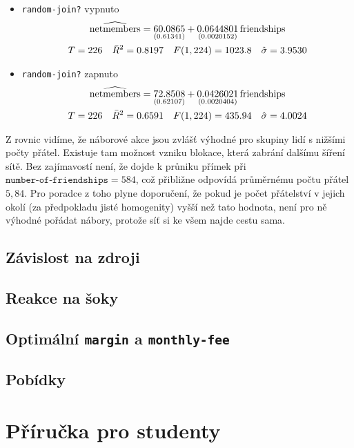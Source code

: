 \documentclass[a4wide,12pt]{report}
\begin{document}
\begin{itemize}
\item \texttt{random-join?} vypnuto\\
\begin{gather}
\widehat{\rm netmembers} = 
\underset{(0.61341)}{60.0865}
+\underset{(0.0020152)}{0.0644801}\,\mbox{friendships}
 \notag \\
T = 226 \quad \bar{R}^2 = 0.8197 \quad F(1,224) = 1023.8 \quad \hat{\sigma} = 3.9530 \notag
\end{gather}

\item \texttt{random-join?} zapnuto\\
\begin{gather}
\widehat{\rm netmembers} = 
\underset{(0.62107)}{72.8508}
+\underset{(0.0020404)}{0.0426021}\,\mbox{friendships}
 \notag \\
T = 226 \quad \bar{R}^2 = 0.6591 \quad F(1,224) = 435.94 \quad \hat{\sigma} = 4.0024 \notag
\end{gather}
\end{itemize}
Z rovnic vidíme, že náborové akce jsou zvlášť výhodné pro skupiny lidí s nižšími počty přátel. Existuje tam možnost vzniku blokace, která zabrání dalšímu šíření sítě. Bez zajímavostí není, že dojde k průniku přímek při $\texttt{number-of-friendships}=584$, což přibližne odpovídá průměrnému počtu přátel $5,84$. Pro poradce z toho plyne doporučení, že pokud je počet přátelství v jejich okolí (za předpokladu jisté homogenity) vyšší než tato hodnota, není pro ně výhodné pořádat nábory, protože síť si ke všem najde cestu sama.
\section{Závislost na zdroji}
\section{Reakce na šoky}
\section{Optimální \texttt{margin} a \texttt{monthly-fee}}
\section{Pobídky}
\chapter*{Příručka pro studenty}
\end{document}
